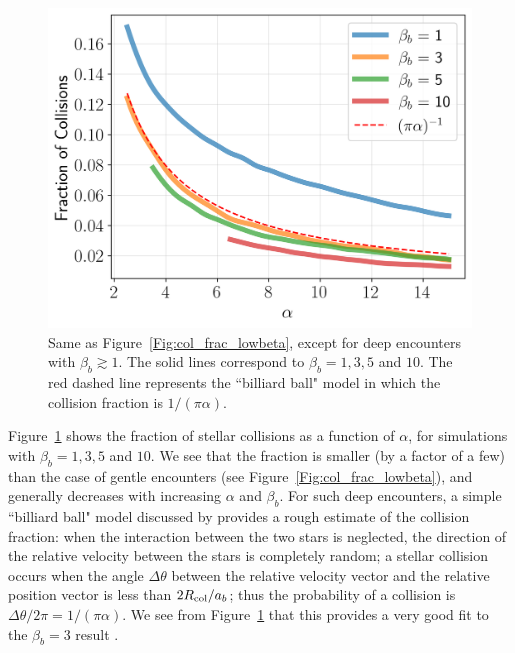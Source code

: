 \documentclass[twocolumn]{aastex631}
\begin{document}
\begin{figure}[htbp]
\centering
\includegraphics[width=1.02\columnwidth]{figures/col_frac_highbeta.png}
\caption{
Same as Figure~\ref{Fig:col_frac_lowbeta}, except for deep encounters with $\beta_b \gtrsim 1$.
The solid lines correspond to $\beta_b=1, 3, 5$ and $10$.
The red dashed line represents the ``billiard ball" model in which the collision fraction is $1/(\pi \alpha)$.}
\label{Fig:col_frac_highbeta}
\end{figure}

Figure~\ref{Fig:col_frac_highbeta} shows the fraction of stellar collisions as a function of $\alpha$, for simulations with $\beta_b =1, 3, 5$ and $10$.
We see that the fraction is smaller (by a factor of a few) than the case of gentle encounters (see Figure~\ref{Fig:col_frac_lowbeta}), and generally decreases with increasing $\alpha$ and $\beta_b$.
For such deep encounters, a simple ``billiard ball" model discussed by \citet{Ginsburg2007MNRAS} provides a rough estimate of the collision fraction: 
when the interaction between the two stars is neglected, the direction of the relative velocity between the stars is completely random; 
a stellar collision occurs when the angle $\Delta \theta$ between the relative velocity vector and the relative position vector is less than $2R_{\rm col}/a_b$; 
thus the probability of a collision is $\Delta \theta/ 2\pi= 1/(\pi \alpha)$.
We see from Figure~\ref{Fig:col_frac_highbeta} that this provides a very good fit to the $\beta_b = 3$ result
\citep[see also Table.~1 of][]{Ginsburg2007MNRAS}.


\end{document}

